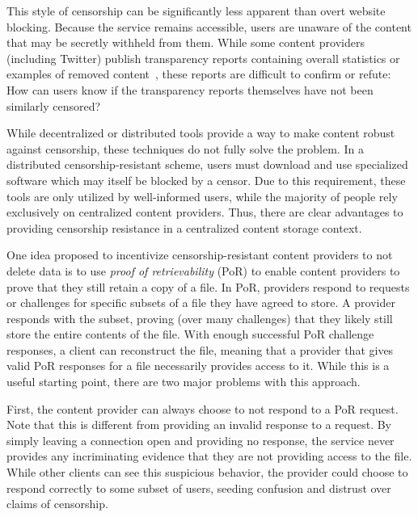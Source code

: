 This style of censorship can be significantly less apparent than overt website
blocking.  Because the service remains accessible, users are unaware of the
content that may be secretly withheld from them. While some content providers
(including Twitter) publish transparency reports containing overall statistics
or examples of removed
content~\cite{twitter-transparency,facebook-transparency,google-transparency},
these reports are difficult to confirm or refute: How can users know if the
transparency reports themselves have not been similarly censored?

While decentralized or distributed tools provide a way to make content robust
against censorship, these techniques do not fully solve the problem. In a
distributed censorship-resistant scheme, users must download and use specialized
software which may itself be blocked by a censor. Due to this requirement,
these tools are only utilized by well-informed users, while the majority of
people rely exclusively on centralized content providers. Thus, there are clear
advantages to providing censorship resistance in a centralized content storage
context.

One idea proposed to incentivize censorship-resistant content
providers to not delete data  is to use \emph{proof of retrievability} (PoR) to enable content providers
to prove that they still retain a copy of a file. In PoR, providers respond to
requests or challenges for specific subsets of a file they have agreed to store.
A provider responds with the subset, proving (over many challenges) that they
likely still store the entire contents of the file. With enough successful PoR
challenge responses, a client can reconstruct the file, meaning that a provider
that gives valid PoR responses for a file necessarily provides access to it.
While this is a useful starting point, there are two major problems with this approach.


First, the content provider can always choose to not respond to a PoR request.
Note that this is different from providing an invalid response to a request. By
simply leaving a connection open and providing no response, the service never
provides any incriminating evidence that they are not providing access to the
file. While other clients can see this suspicious behavior, the provider could
choose to respond correctly to some subset of users, seeding confusion
and distrust over claims of censorship.

